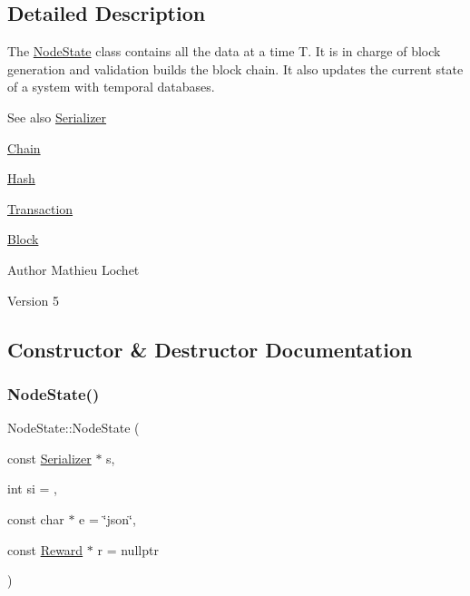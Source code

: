\subsection{Detailed Description}
The \mbox{\hyperlink{classNodeState}{Node\+State}} class contains all the data at a time T. It is in charge of block generation and validation builds the block chain. It also updates the current state of a system with temporal databases. \begin{DoxySeeAlso}{See also}
\mbox{\hyperlink{classSerializer}{Serializer}} 

\mbox{\hyperlink{classChain}{Chain}} 

\mbox{\hyperlink{classHash}{Hash}} 

\mbox{\hyperlink{classTransaction}{Transaction}} 

\mbox{\hyperlink{classBlock}{Block}}
\end{DoxySeeAlso}
\begin{DoxyAuthor}{Author}
Mathieu Lochet 
\end{DoxyAuthor}
\begin{DoxyVersion}{Version}
5 
\end{DoxyVersion}


\subsection{Constructor \& Destructor Documentation}
\mbox{\label{classNodeState_acd97fc0d223a0037fb60228ef3a8d8fc}} 
\subsubsection{\texorpdfstring{Node\+State()}{NodeState()}}
{\footnotesize\ttfamily Node\+State\+::\+Node\+State (\begin{DoxyParamCaption}\item[{const \mbox{\hyperlink{classSerializer}{Serializer}} $\ast$}]{s,  }\item[{int}]{si = {},  }\item[{const char $\ast$}]{e = {\ttfamily \char`\"{}json\char`\"{}},  }\item[{const \mbox{\hyperlink{classReward}{Reward}} $\ast$}]{r = {\ttfamily nullptr} }\end{DoxyParamCaption})\hspace{0.3cm}{\ttfamily [explicit]}}

